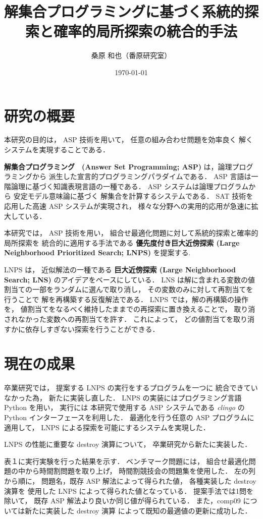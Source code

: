 \documentclass[a4j,10pt]{jarticle}
\title{解集合プログラミングに基づく系統的探索と確率的局所探索の統合的手法}
\author{桑原 和也（番原研究室）}
\date{\today}
\begin{document}
\maketitle
\thispagestyle{empty}
\begin{multicols}{1}

\section{研究の概要}
本研究の目的は，
ASP 技術を用いて，
任意の組み合わせ問題を効率良く
解くシステムを実現することである．

\textbf{解集合プログラミング　(Answer Set Programming; ASP)}
は，論理プログラミングから
派生した宣言的プログラミングパラダイムである．
ASP 言語は一階論理に基づく知識表現言語の一種である．
ASP システムは論理プログラムから
安定モデル意味論に基づく
解集合を計算するシステムである．
SAT 技術を応用した高速 ASP システムが実現され，
様々な分野への実用的応用が急速に拡大している．

本研究では，
ASP 技術を用い，
組合せ最適化問題に対して系統的探索と確率的局所探索を
統合的に適用する手法である
\textbf{優先度付き巨大近傍探索 (Large Neighborhood Prioritized Search; LNPS)}
を提案する.

LNPS は，
近似解法の一種である
\textbf{巨大近傍探索 (Large Neighborhood Search; LNS)}
のアイデアをベースにしている．
LNS は解に含まれる変数の値割当ての一部をランダムに選んで取り消し，
その変数のみに対して再割当てを行うことで
解を再構築する反復解法である\cite{Psinger_10}．
LNPS では，解の再構築の操作を，
値割当てをなるべく維持したままでの再探索に置き換えることで，
取り消されなかった変数への再割当てを許す．
これによって，
どの値割当てを取り消すかに依存しすぎない探索を行うことができる．

\section{現在の成果}
卒業研究では，
提案する LNPS の実行をするプログラムを一つに
統合できていなかった為，
新たに実装し直した．
LNPS の実装にはプログラミング言語 Python を用い，
実行には 本研究で使用する
ASP システムである
\textit{clingo} の Python インターフェースを利用した．
最適化を行う任意の ASP プログラムに適用して，
LNPS による探索を可能にするシステムを実現した．

LNPS の性能に重要な destroy 演算について，
卒業研究から新たに実装した．

表１に実行実験を行った結果を示す．
ベンチマーク問題には，
組合せ最適化問題の中から時間割問題を取り上げ，
時間割競技会の問題集を使用した．
左の列から順に，
問題名，既存 ASP 解法によって得られた値，
各種実装した destroy 演算を
使用した LNPS によって得られた値となっている．
提案手法では1問を除いて，
既存 ASP 解法より良いか同じ値が得られている．
また，comp09 については新たに実装した destroy 演算
によって既知の最適値の更新に成功した．


\end{multicols}
\end{document}
